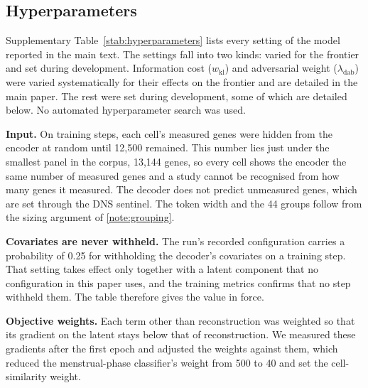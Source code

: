 \begin{table}[t]
\centering
\caption[Size buckets]{\textbf{The size buckets of the reported model.}
Padded length includes the learned summary token. Arithmetic on padding is
the share of padded attention work, $n_b L_b^2$ summed, spent on empty
positions. Generated by running the model's own partition on its
vocabulary, and checked against the partition the training run recorded.}
\label{stab:buckets}
\small

\end{table}

\subsection{Hyperparameters}
\label{smeth:hyperparameters}

Supplementary Table~\ref{stab:hyperparameters} lists every setting of the
model reported in the main text. The settings fall into two kinds:
varied for the frontier and set during development.
Information cost ($w_{\mathrm{kl}}$) and adversarial weight ($\lambda_{\mathrm{dab}}$) were varied
systematically for their effects on the frontier and are detailed in 
the main paper. The rest were set during development, some of which are 
detailed below. No automated hyperparameter search was used.

\textbf{Input.} On training steps, each cell's
measured genes were hidden from the encoder at random until 12{,}500
remained. This number lies just under the smallest panel in the corpus,
13{,}144 genes, so every cell shows the encoder the same number of
measured genes and a study cannot be recognised from how many genes it
measured. The decoder does not predict unmeasured genes, which are set
through the DNS sentinel. The 
token width and the 44 groups follow from the sizing argument of \ref{note:grouping}.

\textbf{Covariates are never withheld.} The run's recorded configuration
carries a probability of 0.25 for withholding the decoder's covariates on a
training step. That setting takes effect only together with a latent
component that no configuration in this paper uses, and the training metrics
confirms that no step withheld them. The table therefore gives the value in
force.

\textbf{Objective weights.} Each term other than reconstruction was
weighted so that its gradient on the latent stays below that of
reconstruction. We measured these gradients after the first epoch and
adjusted the weights against them, which reduced the menstrual-phase
classifier's weight from 500 to 40 and set the cell-similarity weight.

